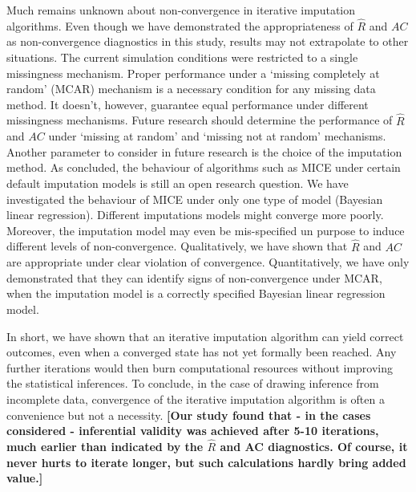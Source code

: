 \documentclass[Royal,times,sageh]{sagej}
\begin{document}
Much remains unknown about non-convergence in iterative imputation algorithms. Even though we have demonstrated the appropriateness of \(\widehat{R}\) and \(AC\) as non-convergence diagnostics in this study, results may not extrapolate to other situations. The current simulation conditions were restricted to a single missingness mechanism. Proper performance under a `missing completely at random' (MCAR) mechanism is a necessary condition for any missing data method. It doesn't, however, guarantee equal performance under different missingness mechanisms. Future research should determine the performance of \(\widehat{R}\) and \(AC\) under `missing at random' and `missing not at random' mechanisms.
Another parameter to consider in future research is the choice of the imputation method. As \citet{murr18} concluded, the behaviour of algorithms such as MICE under certain default imputation models is still an open research question. We have investigated the behaviour of MICE under only one type of model (Bayesian linear regression). Different imputations models might converge more poorly. Moreover, the imputation model may even be mis-specified un purpose to induce different levels of non-convergence. Qualitatively, we have shown that \(\widehat{R}\) and \(AC\) are appropriate under clear violation of convergence. Quantitatively, we have only demonstrated that they can identify signs of non-convergence under MCAR, when the imputation model is a correctly specified Bayesian linear regression model. \newline \newline

\noindent In short, we have shown that an iterative imputation algorithm can yield correct outcomes, even when a converged state has not yet formally been reached. Any further iterations would then burn computational resources without improving the statistical inferences. To conclude, in the case of drawing inference from incomplete data, convergence of the iterative imputation algorithm is often a convenience but not a necessity. \textbf{{[}Our study found that - in the cases considered - inferential validity was achieved after 5-10 iterations, much earlier than indicated by the \(\widehat{R}\) and AC diagnostics. Of course, it never hurts to iterate longer, but such calculations hardly bring added value.{]}}



\end{document}
